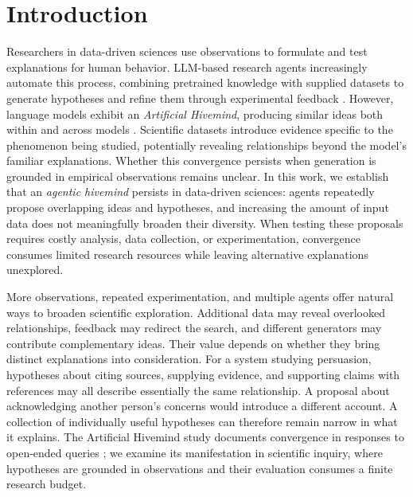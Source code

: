 \section{Introduction}
\label{sec:introduction}

Researchers in data-driven sciences use observations to formulate and test explanations for human behavior. LLM-based research agents increasingly automate this process, combining pretrained knowledge with supplied datasets to generate hypotheses and refine them through experimental feedback \citep{zhou2024hypothesis,sengupta2026experigen}. However, language models exhibit an \emph{Artificial Hivemind}, producing similar ideas both within and across models \citep{jiang2025artificialhivemind}. Scientific datasets introduce evidence specific to the phenomenon being studied, potentially revealing relationships beyond the model's familiar explanations. Whether this convergence persists when generation is grounded in empirical observations remains unclear. In this work, we establish that an \emph{agentic hivemind} persists in data-driven sciences: agents repeatedly propose overlapping ideas and hypotheses, and increasing the amount of input data does not meaningfully broaden their diversity. When testing these proposals requires costly analysis, data collection, or experimentation, convergence consumes limited research resources while leaving alternative explanations unexplored.

More observations, repeated experimentation, and multiple agents offer natural ways to broaden scientific exploration. Additional data may reveal overlooked relationships, feedback may redirect the search, and different generators may contribute complementary ideas. Their value depends on whether they bring distinct explanations into consideration. For a system studying persuasion, hypotheses about citing sources, supplying evidence, and supporting claims with references may all describe essentially the same relationship. A proposal about acknowledging another person's concerns would introduce a different account. A collection of individually useful hypotheses can therefore remain narrow in what it explains. The Artificial Hivemind study documents convergence in responses to open-ended queries \citep{jiang2025artificialhivemind}; we examine its manifestation in scientific inquiry, where hypotheses are grounded in observations and their evaluation consumes a finite research budget.

